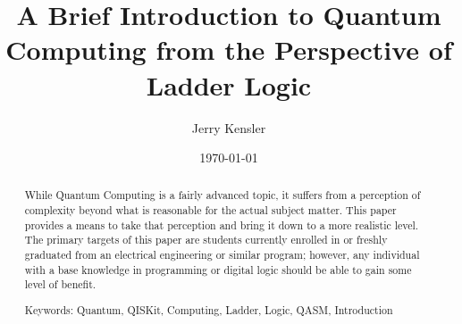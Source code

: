 \documentclass[a4paper]{article}
\title{A Brief Introduction to Quantum Computing from the Perspective of Ladder Logic}
\author{Jerry Kensler}
\date{\today}
\begin{document}
\maketitle

\begin{abstract}

\begin{comment}
	
%

\end{comment}

While Quantum Computing is a fairly advanced topic, it suffers from a perception of complexity beyond what is reasonable for the actual subject matter.  This paper provides a means to take that perception and bring it down to a more realistic level.  The primary targets of this paper are students currently enrolled in or freshly graduated from an electrical engineering or similar program; however, any individual with a base knowledge in programming or digital logic should be able to gain some level of benefit.

Keywords:  Quantum, QISKit, Computing, Ladder, Logic, QASM, Introduction
\end{abstract}
\end{document}
